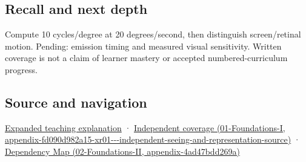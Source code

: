 \subsection{Recall and next depth}\label{appendix-70895739febb-recall-and-next-depth}

Compute 10 cycles/degree at 20 degrees/second, then distinguish screen/retinal motion. Pending: emission timing and measured visual sensitivity. Written coverage is not a claim of learner mastery or accepted numbered-curriculum progress.

\subsection{Source and navigation}\label{appendix-70895739febb-source-and-navigation}

\href{Continuous\%20Notes/University\%20-\%20Worlds,\%20Images\%20and\%20Inference\%20-\%20Graphics,\%20Vision\%20and\%20Photography\#A\%20gaze\%20sample\%20needs\%20a\%20time\%20as\%20well\%20as\%20a\%20direction}{Expanded teaching explanation} · \href{../01-Foundations-I/main.pdf\#nameddest=appendix-fd090d982a15-xr01---independent-seeing-and-representation-source}{Independent coverage (01-Foundations-I, appendix-fd090d982a15-xr01-\/-\/-independent-seeing-and-representation-source)} · \href{../02-Foundations-II/main.pdf\#nameddest=appendix-4ad47bdd269a}{Dependency Map (02-Foundations-II, appendix-4ad47bdd269a)}

